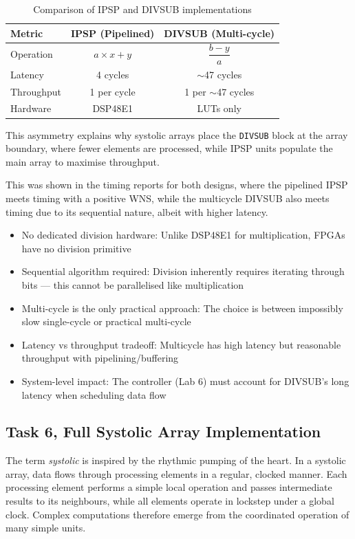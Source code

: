 \documentclass[a4paper,12pt]{article}
\begin{document}
\begin{table}[h]
\centering
\begin{tabular}{l c c}
\hline
\textbf{Metric} & \textbf{IPSP (Pipelined)} & \textbf{DIVSUB (Multi-cycle)} \\
\hline
Operation & $a \times x + y$ & $\dfrac{b - y}{a}$ \\
Latency & 4 cycles & $\sim$47 cycles \\
Throughput & 1 per cycle & 1 per $\sim$47 cycles \\
Hardware & DSP48E1 & LUTs only \\
\hline
\end{tabular}
\caption{Comparison of IPSP and DIVSUB implementations}
\end{table}

This asymmetry explains why systolic arrays place the \texttt{DIVSUB} block at the array boundary, where fewer elements are processed, while IPSP units populate the main array to maximise throughput.

This was shown in the timing reports for both designs, where the pipelined IPSP meets timing with a positive WNS, while the multi\-cycle DIVSUB also meets timing due to its sequential nature, albeit with higher latency.

\begin{itemize}
    \item No dedicated division hardware: Unlike DSP48E1 for multiplication, FPGAs have no division primitive
    \item Sequential algorithm required: Division inherently requires iterating through bits — this cannot be parallelised like multiplication
    \item Multi-cycle is the only practical approach: The choice is between impossibly slow single-cycle or practical multi-cycle
    \item Latency vs throughput trade\-off: Multi\-cycle has high latency but reasonable throughput with pipelining/buffering
    \item System-level impact: The controller (Lab 6) must account for DIVSUB's long latency when scheduling data flow
\end{itemize}

\subsection{Task 6, Full Systolic Array Implementation}

The term \emph{systolic} is inspired by the rhythmic pumping of the heart. In a systolic array, data flows through processing elements in a regular, clocked manner. Each processing element performs a simple local operation and passes intermediate results to its neighbours, while all elements operate in lockstep under a global clock. Complex computations therefore emerge from the coordinated operation of many simple units.
\end{document}
